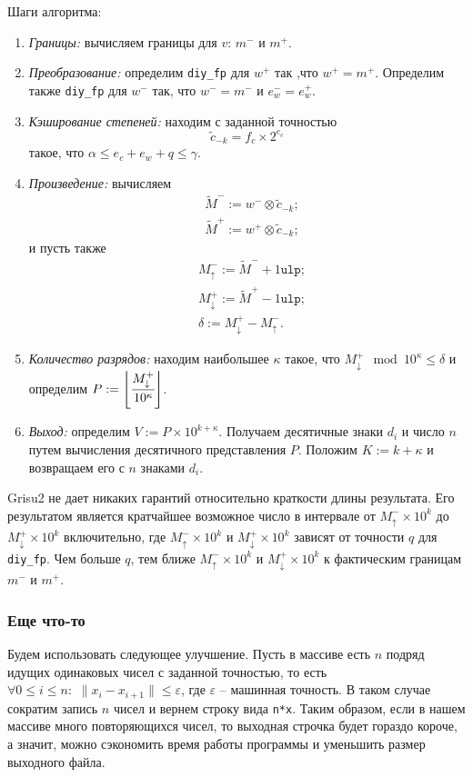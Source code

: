 \documentclass[specialist,subf,href,colorlinks=true,14pt
,times,mtpro,specialist
]{disser}
\begin{document}
Шаги алгоритма:
\begin{enumerate}
\item \textit{Границы:} вычисляем границы для $v$: $m^{-}$ и $m^{+}$. 
\item \textit{Преобразование:} определим \texttt{diy\_fp} для $w^+$ так ,что $w^+ = m^+$. 
Определим также \texttt{diy\_fp} для $w^-$ так, что $w^{-} = m^-$ и $e_w^- = e_w^+$.
\item \textit{Кэширование степеней:} находим с заданной точностью $$\tilde{c}_{-k} = f_c \times 2^{e_c}$$ такое, что $\alpha \leqslant e_c + e_w + q \leqslant \gamma$.
\item \textit{Произведение:} вычисляем \begin{align*}
&\tilde{M}^- := w^- \otimes \tilde{c}_{-k}; \\
&\tilde{M}^+ := w^+ \otimes \tilde{c}_{-k};
\end{align*}и пусть также \begin{align*} & M_\uparrow^- := \tilde{M}^- + 1 \texttt{ulp};\\
& M_\downarrow^+ := \tilde{M}^+ - 1 \texttt{ulp};\\
& \delta := M_\downarrow^+ - M_\uparrow^-.
\end{align*}
\item \textit{Количество разрядов:} находим наибольшее $\kappa$ такое, что $M_\downarrow^+ \mod 10^\kappa \leqslant \delta$ и определим $P:= \left\lfloor \cfrac{M_\downarrow^+}{10^\kappa} \right\rfloor$.
\item \textit{Выход:} определим $V:= P \times 10^{k + \kappa}$. 
Получаем десятичные знаки $d_i$ и число $n$ путем вычисления десятичного представления $P$.
Положим $K:=k+\kappa$ и возвращаем его с $n$ знаками $d_i$.
\end{enumerate}

\textsf{Grisu2} не дает никаких гарантий относительно краткости длины результата. 
Его результатом является кратчайшее возможное число в интервале от $M_\uparrow^- \times 10^k$ до $M_\downarrow^+ \times 10^k$ включительно, где $M_\uparrow^- \times 10^k$ и $M_\downarrow^+ \times 10^k$  зависят от точности $q$ для \texttt{diy\_fp}.
Чем больше $q$, тем ближе $M_\uparrow^- \times 10^k$ и $M_\downarrow^+ \times 10^k$ к фактическим границам $m^-$ и $m^+$. 

\subsubsection{Еще что-то}
Будем использовать следующее улучшение.
Пусть в массиве есть $n$ подряд идущих одинаковых чисел с заданной точностью, то есть $\forall 0 \leqslant i \leqslant n: \,\, \|x_i - x_{i+1}\| \leqslant \varepsilon$, где $\varepsilon$ -- машинная точность.
В таком случае сократим запись $n$ чисел и вернем строку вида \texttt{n*x}.
Таким образом, если в нашем массиве много повторяющихся чисел, то выходная строчка будет гораздо короче, а значит, можно сэкономить время работы программы и уменьшить размер выходного файла.
\end{document}

